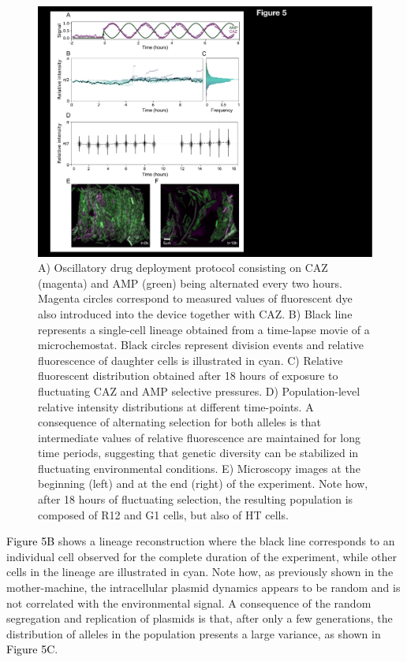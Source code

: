 \documentclass[fleqn,12pt]{wlscirep}
\newcommand{\fig}[1]{\textcolor{black}{#1}}
\begin{document}
\begin{figure}[ht!]
\centering
    \includegraphics[width=0.7\linewidth]{figures/Figure5.pdf}
\caption{ \small{A) Oscillatory drug deployment protocol consisting on CAZ (magenta) and AMP (green) being alternated every two hours. Magenta circles correspond to measured values of fluorescent dye also introduced into the device together with CAZ.  B) Black line represents a single-cell lineage obtained from a time-lapse movie of a microchemostat.  Black circles represent division events and relative fluorescence of daughter cells is illustrated in cyan.  C) Relative fluorescent distribution obtained after 18 hours of exposure to fluctuating CAZ and AMP selective pressures.  D) Population-level relative intensity distributions at different time-points.  A consequence of alternating selection for both alleles is that intermediate values of relative fluorescence are maintained for long time periods, suggesting that genetic diversity can be stabilized in fluctuating environmental conditions. E) Microscopy images at the beginning (left) and at the end (right) of the experiment. Note how, after 18 hours of fluctuating selection, the resulting population is composed of R12 and G1 cells, but also of HT cells.}}
\label{fig:sine}
\end{figure}

\fig{Figure 5B} shows a lineage reconstruction where the black line corresponds to an individual cell observed for the complete duration of the experiment, while other cells in the lineage are illustrated in cyan.  Note how, as previously shown in the mother-machine, the intracellular plasmid dynamics appears to be random and is not correlated with the environmental signal.  A consequence of the random segregation and replication of plasmids is that, after only a few generations, the distribution of alleles in the population presents a large variance, as shown in \fig{Figure 5C}.
\end{document}
